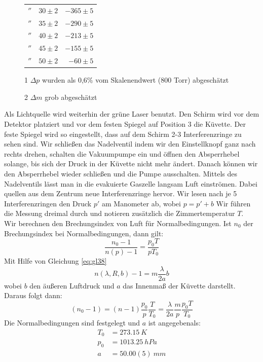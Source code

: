 \documentclass[a4paper,10pt]{article}
\begin{document}
\begin{figure}
\begin{threeparttable}
\begin{tabular}{crr}
\(''\)&\(30\pm2\)&\(-365\pm5\)\\
\(''\)&\(35\pm2\)&\(-290\pm5\)\\
\(''\)&\(40\pm2\)&\(-213\pm5\)\\
\(''\)&\(45\pm2\)&\(-155\pm5\)\\
\(''\)&\(50\pm2\)&\(-60\pm5\)\\
 \bottomrule
 \end{tabular}
\begin{tablenotes}
\raggedright
\item[1] \boldmath\(\Delta p\)  wurden als  0,6\% vom Skalenendwert (800 Torr) abgeschätzt\fnrefb\unboldmath
\item[2] \boldmath\(\Delta m \) grob abgeschätzt\unboldmath
\end{tablenotes}
\end{threeparttable}
\label{tab:Tab2}
\end{figure}
\boldmath
Als Lichtquelle wird weiterhin der grüne Laser benutzt. Den Schirm wird vor dem Detektor platziert und vor dem festen Spiegel auf Position 3 die Küvette. Der feste Spiegel wird so eingestellt, dass auf dem Schirm 2-3 Interferenzringe zu sehen sind. Wir schließen  das Nadelventil indem wir den Einstellknopf ganz nach rechts drehen, schalten die Vakuumpumpe ein und öffnen den Absperrhebel solange, bis sich der Druck in der Küvette nicht mehr ändert. Danach können wir
den Absperrhebel wieder schließen und die Pumpe ausschalten. Mittels des Nadelventils lässt man in die evakuierte Gaszelle langsam Luft einströmen. Dabei
quellen aus dem Zentrum neue Interferenzringe hervor. Wir lesen nach je 5 Interferenzringen den Druck \(p'\) am Manometer ab, wobei \(p=p'+b\) Wir führen die Messung dreimal durch und notieren zusätzlich die Zimmertemperatur \(T\).\\

Wir berechnen den Brechungsindex von Luft für Normalbedingungen. Ist \(n_0\) der
Brechungsindex bei Normalbedingungen, dann gilt:
\begin{equation}
	 \frac{n_0 -1}{n\left(p\right)-1} = \frac{p_0 T}{p T_0}
\end{equation} 
Mit Hilfe von Gleichung \eqref{eq:gl38}
\begin{equation} \label{eq:gl38}
	 n \left( \lambda, R, b\right)-1 = m \frac{\lambda}{2a} b
\end{equation}
wobei \(b\) den äußeren Luftdruck und \(a\) das Innenmaß der Küvette darstellt. Daraus folgt dann:
\begin{equation}\label{eq:gl41}
	 \left({n_0 -1}\right)= \left({n -1}\right)\frac{p_0}{p}\frac{T}{T_0}=\frac{\lambda}{2a}\frac{m}{p}\frac{p_0 T}{T_0}
\end{equation} 
Die Normalbedingungen sind festgelegt und \(a\) ist angegeben\fnrefb als:
\begin{align*}
T_0&=273.15\:K\\
p_0&=1013.25\:hPa\\
a&=50.00(5)\:mm
\end{align*}
\end{document}
